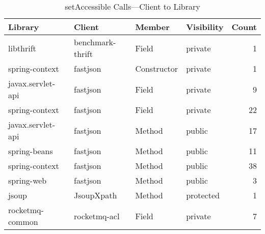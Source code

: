 \begin{table}[ht]
\centering
\begingroup\small
\begin{tabular}{llllr}
  \hline
Library & Client & Member & Visibility & Count \\ 
  \hline
libthrift & benchmark-thrift & Field & private & 1 \\ 
  spring-context & fastjson & Constructor & private & 1 \\ 
  javax.servlet-api & fastjson & Field & private & 9 \\ 
  spring-context & fastjson & Field & private & 22 \\ 
  javax.servlet-api & fastjson & Method & public & 17 \\ 
  spring-beans & fastjson & Method & public & 11 \\ 
  spring-context & fastjson & Method & public & 38 \\ 
  spring-web & fastjson & Method & public & 3 \\ 
  jsoup & JsoupXpath & Method & protected & 1 \\ 
  rocketmq-common & rocketmq-acl & Field & private & 7 \\ 
   \hline
\end{tabular}
\endgroup
\caption{\label{tab:set-accessible-client-to-lib}setAccessible Calls---Client to Library} 
\end{table}
